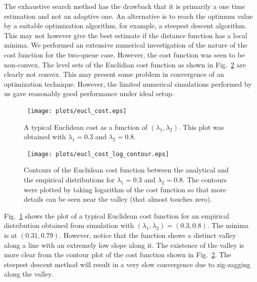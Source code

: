 \documentclass[11pt]{article}
\begin{document}
The exhaustive search method has the drawback that it is primarily a
one time estimation and not an adaptive one. An alternative is to
reach the optimum value by a suitable optimization algorithm, for
example, a steepest descent algorithm. This may not however give the
best estimate if the distance function has a local minima. We
performed an extensive numerical investigation of the nature of the
cost function for the two-queue case. However, the cost function was seen to be non-convex. The level sets
of the Euclidian cost function as shown in Fig.~\ref{fig_contour} are
clearly not convex. This may present some problem in convergence of an
optimization technique. However, the limited numerical simulations
performed by us gave reasonably good performance under ideal setup.

\begin{figure}
  \begin{center}
    \ \texttt{[image: plots/eucl\_cost.eps]}
  \end{center}
  \caption{A typical Euclidean cost as a function of $(\lambda_1,
    \lambda_2)$. This plot was obtained with $\lambda_1=0.3$ and
    $\lambda_2=0.8.$}
  \label{fig_cost}
\end{figure}
\begin{figure}
  \begin{center}
    \ \texttt{[image: plots/eucl\_cost\_log\_contour.eps]}
  \end{center}
  \caption{Contours of the Euclidean cost function between the
    analytical and the empirical distributions for $\lambda_1=0.3$ and
    $\lambda_2=0.8.$ The contours were plotted by taking logarithm of
    the cost function so that more details can be seen near the valley
    (that almost touches zero).  }
  \label{fig_contour}
\end{figure}

Fig.~\ref{fig_cost} shows the plot of a typical Euclidean cost
function for an empirical distribution obtained from simulation with
$(\lambda_1, \lambda_2)=(0.3,0.8)$. The minima is at $(0.31,0.79)$.
However, notice that the function shows a distinct valley along a line
with an extremely low slope along it.  The existence of the valley is
more clear from the contour plot of the cost function shown in
Fig.~\ref{fig_contour}. The steepest descent method will result in a
very slow convergence due to zig-zagging along the valley.
 
\end{document}
